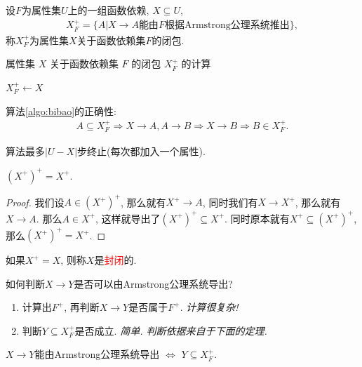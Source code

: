 \begin{definition}[属性集的闭包]
  设$F$为属性集$U$上的一组函数依赖, $X\subseteq U$,
  \begin{align*}
    X_F^+=\{A|X\to A\text{能由}F\text{根据Armstrong公理系统推出}\},
  \end{align*}
  称$X_F^+$为属性集$X$关于函数依赖集$F$的闭包.
\end{definition}

\begin{algorithm}[H]
\caption{属性集 $X$ 关于函数依赖集 $F$ 的闭包 $X_F^+$ 的计算}
\label{algo:bibao}

$X_F^+ \gets X$\;

\end{algorithm}


算法\ref{algo:bibao}的正确性: 
\begin{align*}
  A \subseteq X_F^+ \Rightarrow X\to A, A \to B \Rightarrow X\to B \Rightarrow B \in X_F^+.
\end{align*}

算法最多$|U-X|$步终止(每次都加入一个属性).

\begin{theorem}[闭包的封闭性]
  $(X^+)^+=X^+$.
\end{theorem}
\begin{proof}
  我们设$A\in(X^+)^+$, 那么就有$X^+\to A$, 同时我们有$X\to X^+$, 那么就有$X\to A$.
  那么$A\in X^+$, 这样就导出了$(X^+)^+\subseteq X^+$. 同时原本就有$X^+\subseteq (X^+)^+$, 
  那么$(X^+)^+=X^+$.
\end{proof}

\begin{definition}[属性集的封闭性]
  如果$X^+=X$, 则称$X$是\textcolor{red}{封闭}的.
\end{definition}

如何判断$X\to Y$是否可以由Armstrong公理系统导出?
\begin{enumerate}
    \item 计算出$F^+$, 再判断$X\to Y$是否属于$F^+$. \textit{计算很复杂!}
    \item 判断$Y\subseteq X_F^+$是否成立. \textit{简单. 判断依据来自于下面的定理.}
\end{enumerate}

\begin{theorem}
  $X\to Y$能由Armstrong公理系统导出 $\Leftrightarrow$ $Y\subseteq X_F^+$.
\end{theorem}


